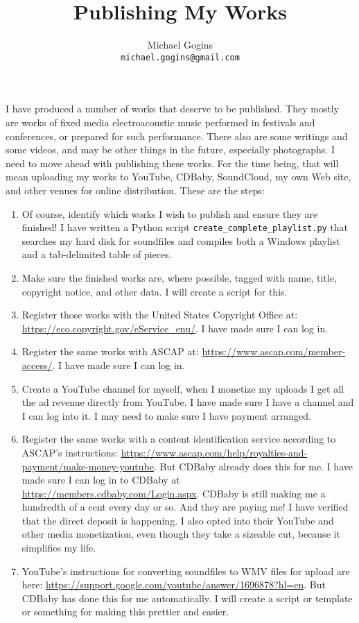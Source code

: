 \documentclass[english,11pt,letterpaper,onecolumn]{scrartcl}
\begin{document}
\title{Publishing My Works}
\author{Michael Gogins \\ \texttt{michael.gogins@gmail.com}}
\maketitle


I have produced a number of works that deserve to be published. They mostly are works of fixed media electroacoustic music performed in festivals and conferences, or prepared for such performance. There also are some writings and some videos, and may be other things in the future, especially photographs. I need to move ahead with publishing these works. For the time being, that will mean uploading my works to YouTube, CDBaby, SoundCloud, my own Web site, and other venues for online distribution. These are the steps:

\begin{enumerate}
\item Of course, identify which works I wish to publish and ensure they are finished! I have written a Python script \texttt{create\_complete\_playlist.py} that searches my hard disk for soundfiles and compiles both a Windows playlist and a tab-delimited table of pieces.
\item Make sure the finished works are, where possible, tagged with name, title, copyright notice, and other data. I will create a script for this.
\item Register those works with the United States Copyright Office at: \url{https://eco.copyright.gov/eService_enu/}. I have made sure I can log in.
\item Register the same works with ASCAP at: \url{https://www.ascap.com/member-access/}. I have made sure I can log in.
\item Create a YouTube channel for myself, when I monetize my uploads I get all the ad revenue directly from YouTube. I have made sure I have a channel and I can log into it. I may need to make sure I have payment arranged.
\item Register the same works with a content identification service according to ASCAP's instructions: \url{https://www.ascap.com/help/royalties-and-payment/make-money-youtube}. But CDBaby already does this for me. I have made sure I can log in to CDBaby at \url{https://members.cdbaby.com/Login.aspx}. CDBaby is still making me a hundredth of a cent every day or so. And they are paying me! I have verified that the direct deposit is happening. I also opted into their YouTube and other media monetization, even though they take a sizeable cut, because it simplifies my life.
\item YouTube's instructions for converting soundfiles to WMV files for upload are here: \url{https://support.google.com/youtube/answer/1696878?hl=en}. But CDBaby has done this for me automatically. I will create a script or template or something for making this prettier and easier.
\end{enumerate}
\end{document}
